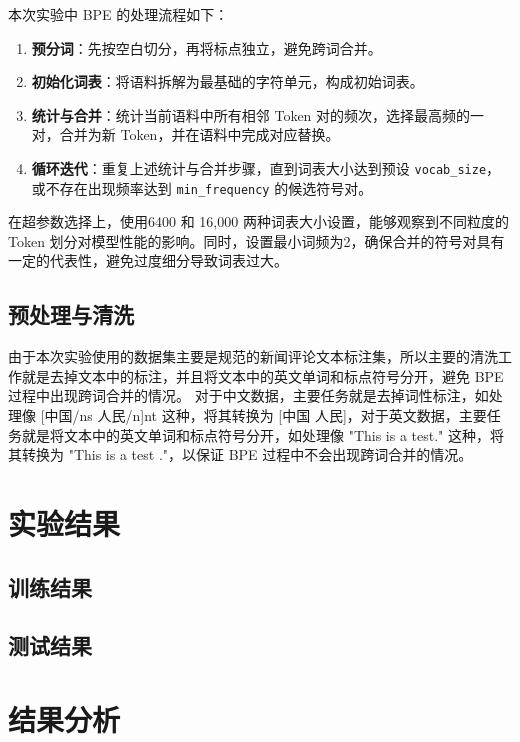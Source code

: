 \documentclass[a4paper,12pt]{ctexart} %
\begin{document}
本次实验中 BPE 的处理流程如下：
\begin{enumerate}
    \item \textbf{预分词}：先按空白切分，再将标点独立，避免跨词合并。
    \item \textbf{初始化词表}：将语料拆解为最基础的字符单元，构成初始词表。
    \item \textbf{统计与合并}：统计当前语料中所有相邻 Token 对的频次，选择最高频的一对，合并为新 Token，并在语料中完成对应替换。
    \item \textbf{循环迭代}：重复上述统计与合并步骤，直到词表大小达到预设 \texttt{vocab\_size}，或不存在出现频率达到 \texttt{min\_frequency} 的候选符号对。
\end{enumerate}
在超参数选择上，使用6400 和 16,000 两种词表大小设置，能够观察到不同粒度的 Token 划分对模型性能的影响。同时，设置最小词频为2，确保合并的符号对具有一定的代表性，避免过度细分导致词表过大。
\subsection{预处理与清洗}
由于本次实验使用的数据集主要是规范的新闻评论文本标注集，所以主要的清洗工作就是去掉文本中的标注，并且将文本中的英文单词和标点符号分开，避免 BPE 过程中出现跨词合并的情况。
对于中文数据，主要任务就是去掉词性标注，如处理像 [中国/ns 人民/n]nt 这种，将其转换为 [中国 人民]，对于英文数据，主要任务就是将文本中的英文单词和标点符号分开，如处理像 "This is a test." 这种，将其转换为 "This is a test ."，以保证 BPE 过程中不会出现跨词合并的情况。

\section{实验结果}


\subsection{训练结果}


\subsection{测试结果}


\section{结果分析}
\end{document}
